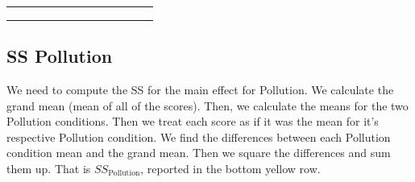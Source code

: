 \documentclass[
  letterpaper,
  DIV=11,
  numbers=noendperiod]{scrreprt}
\begin{document}
\begin{table}
\begin{tabular}{l|l|l|l|l|l|l|l|l|>{}l|>{}l|>{}l|>{}l}
\hline
\cellcolor{lightgray}{Means} & \cellcolor{lightgray}{9.6} & \cellcolor{lightgray}{3.6} & \cellcolor{lightgray}{12.6} & \cellcolor{lightgray}{10} & \cellcolor{lightgray}{} & \cellcolor{lightgray}{} & \cellcolor{lightgray}{} & \cellcolor{lightgray}{} & \cellcolor{yellow}{} & \cellcolor{yellow}{} & \cellcolor{yellow}{} & \cellcolor{yellow}{}\\
\hline
\cellcolor{lightgray}{Grand Mean} & \cellcolor{lightgray}{8.95} & \cellcolor{lightgray}{} & \cellcolor{lightgray}{} & \cellcolor{lightgray}{} & \cellcolor{lightgray}{} & \cellcolor{lightgray}{} & \cellcolor{lightgray}{} & \cellcolor{lightgray}{} & \cellcolor{yellow}{} & \cellcolor{yellow}{} & \cellcolor{yellow}{} & \cellcolor{yellow}{}\\
\hline
\cellcolor{yellow}{sums} & \cellcolor{yellow}{} & \cellcolor{yellow}{} & \cellcolor{yellow}{} & \cellcolor{yellow}{} & \cellcolor{yellow}{} & \cellcolor{yellow}{} & \cellcolor{yellow}{} & \cellcolor{yellow}{Sums} & \cellcolor{yellow}{7.3125} & \cellcolor{yellow}{148.3125} & \cellcolor{yellow}{71.8125} & \cellcolor{yellow}{15.5125}\\
\hline
\cellcolor{yellow}{SS Total} & \cellcolor{yellow}{} & \cellcolor{yellow}{} & \cellcolor{yellow}{} & \cellcolor{yellow}{} & \cellcolor{yellow}{} & \cellcolor{yellow}{} & \cellcolor{yellow}{} & \cellcolor{yellow}{SS Total} & \cellcolor{yellow}{242.95} & \cellcolor{yellow}{} & \cellcolor{yellow}{} & \cellcolor{yellow}{}\\
\hline
\end{tabular}
\end{table}

\subsection{SS Pollution}\label{ss-pollution}

We need to compute the SS for the main effect for Pollution. We
calculate the grand mean (mean of all of the scores). Then, we calculate
the means for the two Pollution conditions. Then we treat each score as
if it was the mean for it's respective Pollution condition. We find the
differences between each Pollution condition mean and the grand mean.
Then we square the differences and sum them up. That is
\(SS_\text{Pollution}\), reported in the bottom yellow row.
\end{document}
